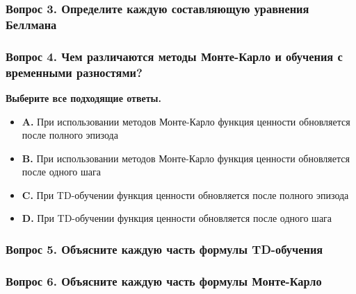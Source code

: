 \documentclass[11pt,a4paper]{article}
\begin{document}
\subsubsection{Вопрос 3. Определите каждую составляющую уравнения Беллмана}\label{q3-define-each-part-of-the-bellman-equation}


\subsubsection{Вопрос 4. Чем различаются методы Монте-Карло и обучения с временными разностями?}\label{q4-what-is-the-difference-between-monte-carlo-and-temporal-difference-learning-methods}

\textbf{Выберите все подходящие ответы.}

\begin{itemize}
\tightlist
\item
  \textbf{A.} При использовании методов Монте-Карло функция ценности обновляется после полного эпизода
\item
  \textbf{B.} При использовании методов Монте-Карло функция ценности обновляется после одного шага
\item
  \textbf{C.} При TD-обучении функция ценности обновляется после полного эпизода
\item
  \textbf{D.} При TD-обучении функция ценности обновляется после одного шага
\end{itemize}

\subsubsection{Вопрос 5. Объясните каждую часть формулы TD-обучения}\label{q5-define-each-part-of-temporal-difference-learning-formula}


\subsubsection{Вопрос 6. Объясните каждую часть формулы Монте-Карло}\label{q6-define-each-part-of-monte-carlo-learning-formula}
\end{document}
